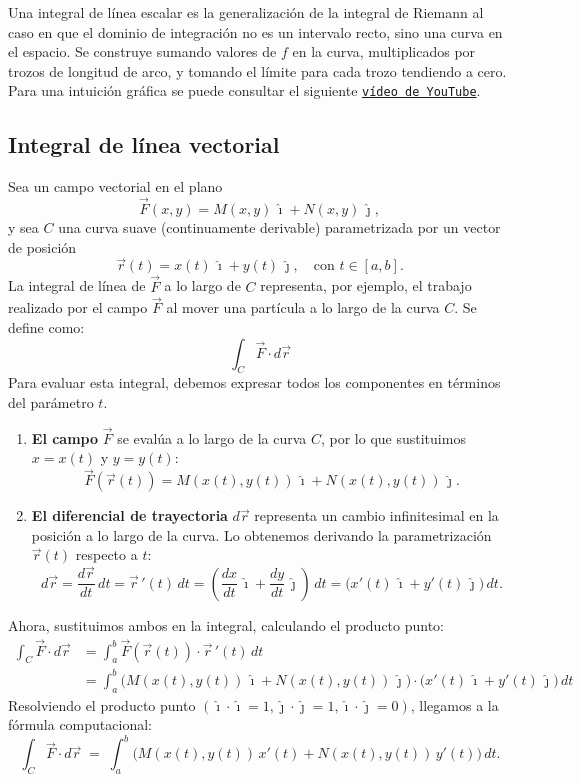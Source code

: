 Una integral de línea escalar es la generalización de la integral de Riemann al caso en que el dominio de integración no es un intervalo recto, sino una curva en el espacio. Se construye sumando valores de $f$ en la curva, multiplicados por trozos de longitud de arco, y tomando el límite para cada trozo tendiendo a cero. Para una intuición gráfica se puede consultar el siguiente \href{https://www.youtube.com/watch?v=wCphv9dCswg}{\texttt{vídeo de YouTube}}.

\subsection{Integral de línea vectorial}

Sea un campo vectorial en el plano
$$
\vec{F}(x,y) = M(x,y)\,\hat{\imath} + N(x,y)\,\hat{\jmath},
$$
y sea $C$ una curva suave (continuamente derivable) parametrizada por un vector de posición
$$
\vec{r}(t) = x(t)\,\hat{\imath} + y(t)\,\hat{\jmath}, \quad \text{con } t \in [a,b].
$$
La integral de línea de $\vec{F}$ a lo largo de $C$ representa, por ejemplo, el trabajo realizado por el campo $\vec{F}$ al mover una partícula a lo largo de la curva $C$. Se define como:
$$
\int_C \vec{F}\cdot d\vec{r}
$$
Para evaluar esta integral, debemos expresar todos los componentes en términos del parámetro $t$.

\begin{enumerate}
    \item \textbf{El campo} $\vec{F}$ se evalúa a lo largo de la curva $C$, por lo que sustituimos $x=x(t)$ y $y=y(t)$:
    $$
    \vec{F}(\vec{r}(t)) = M(x(t),y(t))\,\hat{\imath} + N(x(t),y(t))\,\hat{\jmath}.
    $$

    \item \textbf{El diferencial de trayectoria} $d\vec{r}$ representa un cambio infinitesimal en la posición a lo largo de la curva. Lo obtenemos derivando la parametrización $\vec{r}(t)$ respecto a $t$:
    $$
    d\vec{r} = \frac{d\vec{r}}{dt}\,dt = \vec{r}\,'(t)\,dt = \left( \frac{dx}{dt}\,\hat{\imath} + \frac{dy}{dt}\,\hat{\jmath} \right)\,dt = \big( x'(t)\,\hat{\imath} + y'(t)\,\hat{\jmath} \big)\,dt.
    $$
\end{enumerate}

Ahora, sustituimos ambos en la integral, calculando el producto punto:
\begin{align*}
\int_C \vec{F}\cdot d\vec{r} &= \int_a^b \vec{F}(\vec{r}(t)) \cdot \vec{r}\,'(t)\,dt \\
&= \int_a^b \Big( M(x(t),y(t))\,\hat{\imath} + N(x(t),y(t))\,\hat{\jmath} \Big) \cdot \Big( x'(t)\,\hat{\imath} + y'(t)\,\hat{\jmath} \Big)\,dt
\end{align*}
Resolviendo el producto punto $(\hat{\imath}\cdot\hat{\imath}=1, \hat{\jmath}\cdot\hat{\jmath}=1, \hat{\imath}\cdot\hat{\jmath}=0)$, llegamos a la fórmula computacional:
$$
\int_C \vec{F}\cdot d\vec{r} \;=\; \int_a^b \Big( M(x(t),y(t))\,x'(t) + N(x(t),y(t))\,y'(t) \Big)\,dt.
$$

